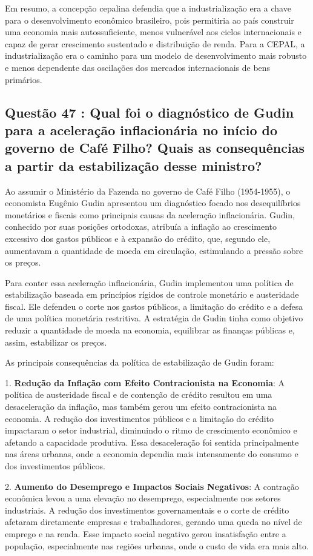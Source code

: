 \documentclass[a4paper,12pt]{article}[abntex2]
\begin{document}
Em resumo, a concepção cepalina defendia que a industrialização era a chave para o desenvolvimento econômico brasileiro, pois permitiria ao país construir uma economia mais autossuficiente, menos vulnerável aos ciclos internacionais e capaz de gerar crescimento sustentado e distribuição de renda. Para a CEPAL, a industrialização era o caminho para um modelo de desenvolvimento mais robusto e menos dependente das oscilações dos mercados internacionais de bens primários.

\subsection{\textbf{Questão 47 : Qual foi o diagnóstico de Gudin para a aceleração inflacionária no início do governo de Café Filho? Quais as consequências a partir da estabilização desse ministro?}}

Ao assumir o Ministério da Fazenda no governo de Café Filho (1954-1955), o economista Eugênio Gudin apresentou um diagnóstico focado nos desequilíbrios monetários e fiscais como principais causas da aceleração inflacionária. Gudin, conhecido por suas posições ortodoxas, atribuía a inflação ao crescimento excessivo dos gastos públicos e à expansão do crédito, que, segundo ele, aumentavam a quantidade de moeda em circulação, estimulando a pressão sobre os preços.

Para conter essa aceleração inflacionária, Gudin implementou uma política de estabilização baseada em princípios rígidos de controle monetário e austeridade fiscal. Ele defendeu o corte nos gastos públicos, a limitação do crédito e a defesa de uma política monetária restritiva. A estratégia de Gudin tinha como objetivo reduzir a quantidade de moeda na economia, equilibrar as finanças públicas e, assim, estabilizar os preços.

As principais consequências da política de estabilização de Gudin foram:

1. \textbf{Redução da Inflação com Efeito Contracionista na Economia}: A política de austeridade fiscal e de contenção de crédito resultou em uma desaceleração da inflação, mas também gerou um efeito contracionista na economia. A redução dos investimentos públicos e a limitação do crédito impactaram o setor industrial, diminuindo o ritmo de crescimento econômico e afetando a capacidade produtiva. Essa desaceleração foi sentida principalmente nas áreas urbanas, onde a economia dependia mais intensamente do consumo e dos investimentos públicos.

2. \textbf{Aumento do Desemprego e Impactos Sociais Negativos}: A contração econômica levou a uma elevação no desemprego, especialmente nos setores industriais. A redução dos investimentos governamentais e o corte de crédito afetaram diretamente empresas e trabalhadores, gerando uma queda no nível de emprego e na renda. Esse impacto social negativo gerou insatisfação entre a população, especialmente nas regiões urbanas, onde o custo de vida era mais alto.
\end{document}
